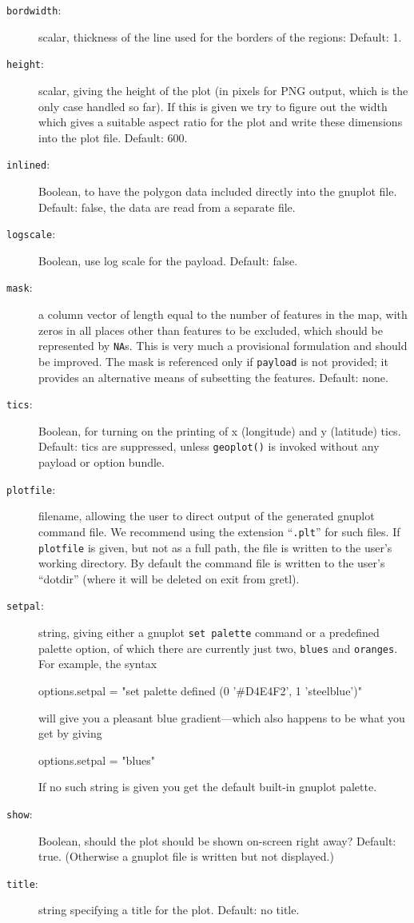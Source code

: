 \documentclass{article}
\begin{document}
\begin{description}
\item[\texttt{bordwidth}:] scalar, thickness of the line used for the
  borders of the regions: Default: 1.
\item[\texttt{height}:] scalar, giving the height of the plot (in
  pixels for PNG output, which is the only case handled so far). If
  this is given we try to figure out the width which gives a suitable
  aspect ratio for the plot and write these dimensions into the plot
  file. Default: 600.
\item[\texttt{inlined}:] Boolean, to have the polygon data included
  directly into the gnuplot file. Default: false, the data are read
  from a separate file.
\item[\texttt{logscale}:] Boolean, use log scale for the
  payload. Default: false.
\item[\texttt{mask}:] a column vector of length equal to the number of
  features in the map, with zeros in all places other than features to
  be excluded, which should be represented by \texttt{NA}s. This is
  very much a provisional formulation and should be improved. The mask
  is referenced only if \texttt{payload} is not provided; it provides
  an alternative means of subsetting the features. Default: none.
\item[\texttt{tics}:] Boolean, for turning on the printing of x
  (longitude) and y (latitude) tics. Default: tics are suppressed,
  unless \texttt{geoplot()} is invoked without any payload or option
  bundle.
\item[\texttt{plotfile}:] filename, allowing the user to direct output
  of the generated gnuplot command file. We recommend using the
  extension ``\texttt{.plt}'' for such files. If \texttt{plotfile} is
  given, but not as a full path, the file is written to the user's
  working directory. By default the command file is written to the
  user's ``dotdir'' (where it will be deleted on exit from gretl).
\item[\texttt{setpal}:] string, giving either a \textsf{gnuplot}
  \texttt{set palette} command or a predefined palette option, of
  which there are currently just two, \texttt{blues} and
  \texttt{oranges}. For example, the syntax
  \begin{code}
    options.setpal = "set palette defined (0 '#D4E4F2', 1 'steelblue')"
  \end{code}
  will give you a pleasant blue gradient---which also happens to be
  what you get by giving
  \begin{code}
    options.setpal = "blues"
  \end{code}
  If no such string is given you get the default built-in
  \textsf{gnuplot} palette.
\item[\texttt{show}:] Boolean, should the plot should be shown
  on-screen right away? Default: true. (Otherwise a gnuplot file is
  written but not displayed.)
\item[\texttt{title}:] string specifying a title for the
  plot. Default: no title.
\end{description}
\end{document}
